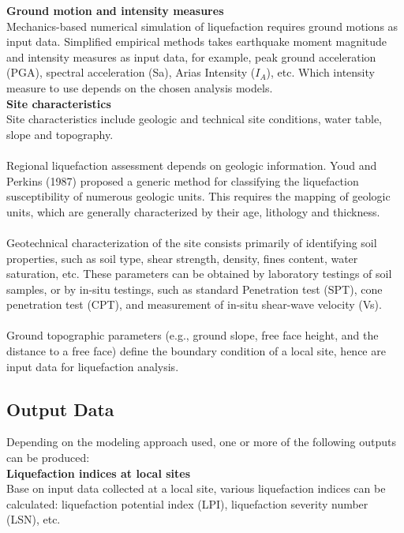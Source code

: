 \noindent\textbf{Ground motion and intensity measures}\\
Mechanics-based numerical simulation of liquefaction requires ground motions as input data. Simplified empirical methods takes earthquake moment magnitude and intensity measures as input data, for example, peak ground acceleration (PGA), spectral acceleration (Sa), Arias Intensity ($I_A$), etc. Which intensity measure to use depends on the chosen analysis models. \\


\noindent\textbf{Site characteristics}\\
Site characteristics include geologic and technical site conditions, water table, slope and topography. \\

\\
Regional liquefaction assessment depends on geologic information.
Youd and Perkins (1987) proposed a generic method for classifying the liquefaction susceptibility of numerous geologic units. This requires the mapping of geologic units, which are generally characterized by their age, lithology and thickness.\\

\\
Geotechnical characterization of the site consists primarily of identifying soil properties, such as soil type, shear strength, density, fines content, water saturation, etc. These parameters can be obtained by laboratory testings of soil samples, or by in-situ testings, such as standard Penetration test (SPT), cone penetration test (CPT), and measurement of in-situ shear-wave velocity (Vs).\\

\\
Ground topographic parameters (e.g., ground slope, free face height, and the distance to a free face) define the boundary condition of a local site, hence are input data for liquefaction analysis. 


\subsection{Output Data}
\label{subsec:eq_liquefaction_output}
Depending on the modeling approach used, one or more of the following outputs can be produced:\\

\noindent\textbf{Liquefaction indices at local sites}\\
Base on input data collected at a local site, various liquefaction indices can be calculated: liquefaction potential index (LPI), liquefaction severity number (LSN), etc. \\

